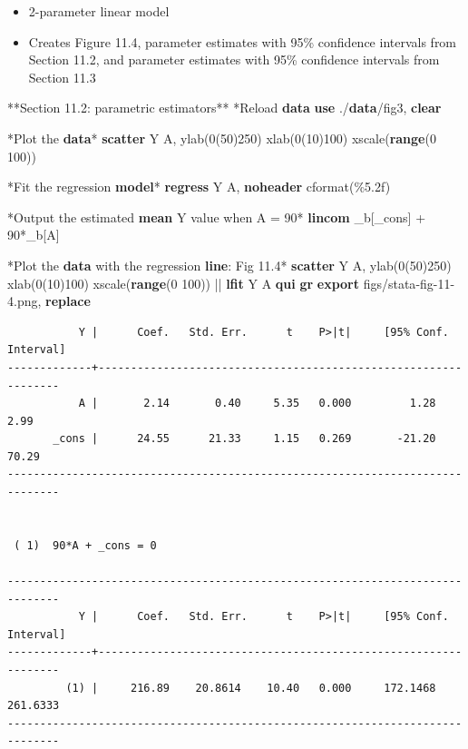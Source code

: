 \documentclass[
  10pt,
]{book}
\newenvironment{Shaded}{\begin{snugshade}}{\end{snugshade}}
\newcommand{\BaseNTok}[1]{\textcolor[rgb]{0.00,0.00,0.81}{#1}}
\newcommand{\DataTypeTok}[1]{\textcolor[rgb]{0.13,0.29,0.53}{#1}}
\newcommand{\KeywordTok}[1]{\textcolor[rgb]{0.13,0.29,0.53}{\textbf{#1}}}
\newcommand{\NormalTok}[1]{#1}
\newcommand{\OtherTok}[1]{\textcolor[rgb]{0.56,0.35,0.01}{#1}}
\providecommand{\tightlist}{%
  \setlength{\itemsep}{0pt}\setlength{\parskip}{0pt}}
\begin{document}
\begin{itemize}
\tightlist
\item
  2-parameter linear model
\item
  Creates Figure 11.4, parameter estimates with 95\% confidence intervals from Section 11.2, and parameter estimates with 95\% confidence intervals from Section 11.3
\end{itemize}

\begin{Shaded}
\begin{Highlighting}[]
\NormalTok{**Section 11.2: parametric estimators**}
\NormalTok{*Reload }\KeywordTok{data}
\KeywordTok{use}\NormalTok{ ./}\KeywordTok{data}\NormalTok{/fig3, }\KeywordTok{clear}

\NormalTok{*Plot the }\KeywordTok{data}\NormalTok{*}
\KeywordTok{scatter}\NormalTok{ Y A, ylab(0(50)250) xlab(0(10)100) }\BaseNTok{xscale}\NormalTok{(}\KeywordTok{range}\NormalTok{(0 100))}

\NormalTok{*Fit the regression }\KeywordTok{model}\NormalTok{*}
\KeywordTok{regress}\NormalTok{ Y A, }\KeywordTok{noheader}\NormalTok{ cformat(\%5.2f)}

\NormalTok{*Output the estimated }\KeywordTok{mean}\NormalTok{ Y }\OtherTok{value}\NormalTok{ when A = 90*}
\KeywordTok{lincom}\NormalTok{ \_b[}\DataTypeTok{\_cons}\NormalTok{] + 90*\_b[A]}

\NormalTok{*Plot the }\KeywordTok{data}\NormalTok{ with the regression }\KeywordTok{line}\NormalTok{: Fig 11.4*}
\KeywordTok{scatter}\NormalTok{ Y A, ylab(0(50)250) xlab(0(10)100) }\BaseNTok{xscale}\NormalTok{(}\KeywordTok{range}\NormalTok{(0 100)) || }\KeywordTok{lfit}\NormalTok{ Y A}
\KeywordTok{qui} \KeywordTok{gr} \KeywordTok{export}\NormalTok{ figs/stata{-}fig{-}11{-}4.png, }\KeywordTok{replace}
\end{Highlighting}
\end{Shaded}

\begin{verbatim}
           Y |      Coef.   Std. Err.      t    P>|t|     [95% Conf. Interval]
-------------+----------------------------------------------------------------
           A |       2.14       0.40     5.35   0.000         1.28        2.99
       _cons |      24.55      21.33     1.15   0.269       -21.20       70.29
------------------------------------------------------------------------------


 ( 1)  90*A + _cons = 0

------------------------------------------------------------------------------
           Y |      Coef.   Std. Err.      t    P>|t|     [95% Conf. Interval]
-------------+----------------------------------------------------------------
         (1) |     216.89    20.8614    10.40   0.000     172.1468    261.6333
------------------------------------------------------------------------------
\end{verbatim}
\end{document}
